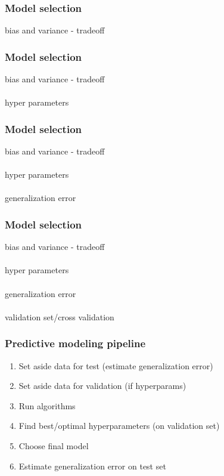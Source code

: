 \documentclass{beamer}
\begin{document}
\begin{frame}
	\frametitle{Model selection}
	\begin{center}
		bias and variance - tradeoff\\
	\end{center}
\end{frame}

\begin{frame}
	\frametitle{Model selection}
	\begin{center}
		bias and variance - tradeoff\\~\\
		hyper parameters
	\end{center}
\end{frame}

\begin{frame}
	\frametitle{Model selection}
	\begin{center}
		bias and variance - tradeoff\\~\\
		hyper parameters\\~\\
		generalization error
	\end{center}
\end{frame}

\begin{frame}
	\frametitle{Model selection}
	\begin{center}
		bias and variance - tradeoff\\~\\
		hyper parameters\\~\\
		generalization error\\~\\
		validation set/cross validation
	\end{center}
\end{frame}

\begin{frame}
	\frametitle{Predictive modeling pipeline}
	\begin{center}
		\begin{enumerate}
			\item Set aside data for test (estimate generalization error)
			\item Set aside data for validation (if hyperparams)
			\item Run algorithms
			\item Find best/optimal hyperparameters (on validation set)
			\item Choose final model
			\item Estimate generalization error on test set
		\end{enumerate}
	\end{center}
\end{frame}
\end{document}
